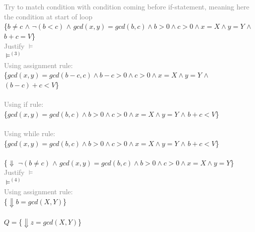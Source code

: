 \documentclass{article}
\begin{document}
\begin{enumerate}
    \\
     \\
    \textcolor{gray}{Try to match condition with condition coming before if-statement, meaning here the condition at start of loop} \\
    \{\colorbox{magenta!10}{$b \neq c$} $\land$ \colorbox{NavyBlue!10}{$\lnot(b<c)$} $\land$ \colorbox{blue!10}{$gcd(x,y)=gcd(b,c) \land b > 0 \land c > 0 \land x=X \land y=Y$}
    $\land$ \colorbox{teal!10}{$b+c = V$}\} 
    \\  \textcolor{gray}{Justify $\vDash$} \\
    $\vDash^{(3)}$ \\
    \textcolor{gray}{Using assignment rule:} \\
    \{$gcd(x,y)=gcd(b-c,c) \land b-c > 0 \land c > 0 \land x=X \land y=Y$ $\land$ \colorbox{teal!10}{$(b-c)+c < V$}\} 
    \\
     \\
    \textcolor{gray}{Using if rule:} \\
    \{$gcd(x,y)=gcd(b,c) \land b >0 \land c > 0 \land x=X \land y=Y$ $\land$ \colorbox{teal!10}{$b+c < V$}\} 
    \\
     \\
    \textcolor{gray}{Using while rule:} \\
    \{$gcd(x,y)=gcd(b,c) \land b >0 \land c > 0 \land x=X \land y=Y$ $\land$ \colorbox{teal!10}{$b+c < V$}\} 
    \\
     \\
    \{$\Downarrow$ \colorbox{magenta!10}{$\lnot(b \neq c)$} $\land$ \colorbox{blue!10}{$gcd(x,y)=gcd(b,c) \land b >0 \land c > 0 \land x=X \land y=Y$}\} 
    \\  \textcolor{gray}{Justify $\vDash$} \\
    $\vDash^{(4)}$ \\
    \textcolor{gray}{Using assignment rule:}\\
    \{$\Downarrow b=gcd(X,Y)$\}
    \\
     \\
    $Q=$\{$\Downarrow z=gcd(X,Y)$\}


\end{enumerate}
\end{document}
